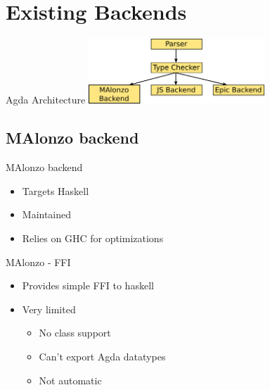 \section{Existing Backends}

\begin{frame}[fragile]{Agda Architecture}
\includegraphics[width=250px]{agda-arch.png}
\end{frame}

\subsection{MAlonzo backend}
\begin{frame}{MAlonzo backend}
\begin{itemize}
\item Targets Haskell
\item Maintained
\item Relies on GHC for optimizations
\end{itemize}
\end{frame}


\begin{frame}{MAlonzo - FFI}
\begin{itemize}
\item Provides simple FFI to haskell
\item Very limited
  \begin{itemize}
    \item No class support
    \item Can't export Agda datatypes
    \item Not automatic
  \end{itemize}
\end{itemize}
\end{frame}


